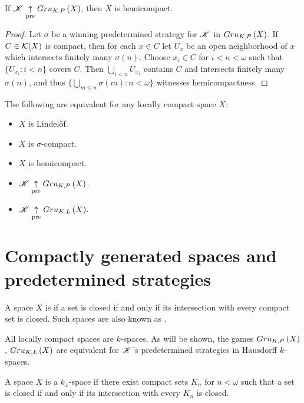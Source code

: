 \begin{thm}
  If $\mathscr{K}\underset{\text{pre}}{\uparrow} Gru_{K,P}\left({X}\right)$, then $X$ is hemicompact.
\end{thm}

\begin{proof}
  Let $\sigma$ be a winning predetermined strategy for $\mathscr{K}$ in
  $Gru_{K,P}\left({X}\right)$. If $C\in \mathcal{K}(X)$ is compact, then for each $x\in C$ let
  $U_x$ be an open neighborhood of $x$ which intersects finitely many
  $\sigma(n)$. Choose $x_i\in C$ for $i<n<\omega$ such that
  $\{U_{x_i}:i<n\}$ covers $C$. Then $\bigcup_{i<n}U_{x_i}$ contains $C$
  and intersects finitely many $\sigma(n)$, and thus
  $\{\bigcup_{m\leq n}\sigma(m):n<\omega\}$ witnesses hemicompactness.
\end{proof}

\begin{cor}
  The following are equivalent for any locally compact space $X$:
    \begin{itemize}
      \item $X$ is Lindel\"of.
      \item $X$ is $\sigma$-compact.
      \item $X$ is hemicompact.
      \item $\mathscr{K} \underset{\text{pre}}{\uparrow} Gru_{K,P}\left({X}\right)$.
      \item $\mathscr{K} \underset{\text{pre}}{\uparrow} Gru_{K,L}\left({X}\right)$.
    \end{itemize}
\end{cor}

\section{Compactly generated spaces and predetermined strategies}

\begin{defn}
  A space $X$ is  if a set is closed if and
  only if its intersection with every compact set is closed. Such
  spaces are also known as .
\end{defn}

All locally compact spaces are $k$-spaces. As will be shown,
the games $Gru_{K,P}\left({X}\right)$, $Gru_{K,L}\left({X}\right)$ are equivalent for $\mathscr{K}$'s
predetermined strategies in Hausdorff $k$-spaces.

\begin{defn}
  A space $X$ is a $k_\omega$-space if there exist compact sets $K_n$ for
  $n<\omega$ such that a set is closed if and
  only if its intersection with every $K_n$ is closed.
\end{defn}

